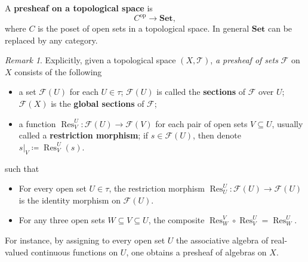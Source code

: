 \documentclass[12pt, letterpaper]{article}
\newcommand{\Res}{\operatorname{Res}}
\newcommand{\opp}[1]{{#1}^{\mathrm{op}}}
\newcommand{\define}{\coloneqq}
\theoremstyle{definition}
\theoremstyle{remark}
\newtheorem*{rem*}{Remark}
\theoremstyle{definition}
\theoremstyle{plain}
\numberwithin{equation}{section}
\begin{document}
	\begin{def*}
		A \textbf{presheaf on a topological space} is
		\[ \opp{C}\to \mathbf{Set},\]
		where $C$ is the poset of open sets in a topological space.
		In general $\mathbf{Set}$ can be replaced by any category.
	\end{def*}
	\begin{rem*}
		Explicitly, given a topological space $(X,\mathcal{T})$,
		\textit{a presheaf of sets} $\mathscr{F}$ on $X$ consists of the following
		\begin{itemize}
			\item a set $\mathscr{F}(U)$ for each $U\in\tau$; 
			$\mathscr{F}(U)$ is called the \textbf{sections} of $\mathscr{F}$ over $U$;
			$\mathscr{F}(X)$ is the \textbf{global sections} of $\mathscr{F}$;
			\item a function  $ \Res_V^U\colon \mathscr{F}(U)\to\mathscr{F}(V) $ for each
			pair of open sets $V\subseteq U$, usually called a \textbf{restriction morphism};
			if $s\in\mathscr{F}(U)$, then denote $s|_V\define \Res_V^U(s)$.
		\end{itemize}
		such that
		\begin{itemize}
			\item For every open set $U\in\tau$,
			the restriction morphism $\Res_U^U\colon \mathscr{F}(U)\to \mathscr{F}(U)$
			is the identity morphism on $\mathscr{F}(U)$.
			\item For any three open sets $ W\subseteq V\subseteq U$,
			the composite $\Res_W^V\circ \Res_V^U=\Res_W^U$.
		\end{itemize}
		
		For instance, by assigning to every open set $U$ the associative algebra of real-valued continuous functions on $U$,
		one obtains a presheaf of algebras on $X$.
	\end{rem*}
\end{document}
